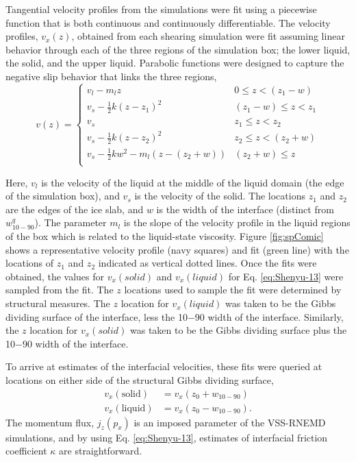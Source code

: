 Tangential velocity profiles from the simulations were fit using a
piecewise function that is both continuous and continuously
differentiable. The velocity profiles, $v_x(z)$, obtained from each
shearing simulation were fit assuming linear behavior through each of
the three regions of the simulation box; the lower liquid, the solid,
and the upper liquid. Parabolic functions were designed to capture the
negative slip behavior that links the three regions,
\begin{equation}\label{eq:vfit}
v(z) =
\begin{cases}
  v_{l} - m_{l}z & 0 \leq z < (z_{1} - w) \\
  v_{s} - \frac{1}{2}k(z-z_{1})^{2} & (z_{1}-w) \leq z < z_{1} \\
  v_{s}  & z_{1} \leq z < z_{2} \\
  v_{s} - \frac{1}{2}k(z-z_{2})^{2}  & z_{2} \leq z <( z_{2} + w)\\
  v_{s} - \frac{1}{2}kw^{2} - m_{l}(z-(z_{2} + w)) & (z_{2} + w) \leq z \\
\end{cases}
\end{equation}
  
Here, $v_{l}$ is the velocity of the liquid at the middle of the
liquid domain (the edge of the simulation box), and $v_{s}$ is the
velocity of the solid. The locations $z_{1}$ and $z_{2}$ are the edges
of the ice slab, and $w$ is the width of the interface (distinct from
$w_{10-90}^{q}$). The parameter $m_{l}$ is the
slope of the velocity profile in the liquid regions of the box which
is related to the liquid-state viscosity. Figure \ref{fig:spComic}
shows a representative velocity profile (navy squares) and fit (green
line) with the locations of $z_{1}$ and $z_{2}$ indicated as vertical
dotted lines. Once the fits were obtained, the values for
$v_{x}(solid)$ and $v_{x}(liquid)$ for Eq. \eqref{eq:Shenyu-13} were
sampled from the fit. The $z$ locations used to sample the fit were
determined by structural measures. The $z$ location for
$v_{x}(liquid)$ was taken to be the Gibbs dividing surface of the
interface, less the 10$-$90 width of the interface. Similarly, the $z$
location for $v_{x}(solid)$ was taken to be the Gibbs dividing surface
plus the 10$-$90 width of the interface.

To arrive at estimates of
the interfacial velocities, these fits were queried at locations on
either side of the structural Gibbs dividing surface,
\begin{align}
v_{x}(\mathrm{solid}) & = v_{x}( z_0 + w_\mathrm{10-90})  \label{eq:vx1}\\
v_{x}(\mathrm{liquid}) & = v_{x}( z_0 - w_\mathrm{10-90}). \label{eq:vx2}
\end{align}
The momentum flux, $j_{z}(p_{x})$ is an imposed parameter of the
VSS-RNEMD simulations, and by using Eq. \eqref{eq:Shenyu-13}, estimates
of interfacial friction coefficient $\kappa$ are straightforward.

